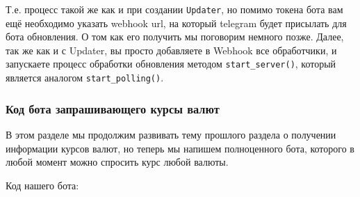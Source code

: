\documentclass[
]{book}
\begin{document}
Т.е. процесс такой же как и при создании \texttt{Updater}, но помимо токена бота вам ещё необходимо указать webhook url, на который telegram будет присылать для бота обновления. О том как его получить мы поговорим немного позже. Далее, так же как и с Updater, вы просто добавляете в Webhook все обработчики, и запускаете процесс обработки обновления методом \texttt{start\_server()}, который является аналогом \texttt{start\_polling()}.

\subsubsection{Код бота запрашивающего курсы валют}\label{ux43aux43eux434-ux431ux43eux442ux430-ux437ux430ux43fux440ux430ux448ux438ux432ux430ux44eux449ux435ux433ux43e-ux43aux443ux440ux441ux44b-ux432ux430ux43bux44eux442}

В этом разделе мы продолжим развивать тему прошлого раздела о получении информации курсов валют, но теперь мы напишем полноценного бота, которого в любой момент можно спросить курс любой валюты.

Код нашего бота:
\end{document}
